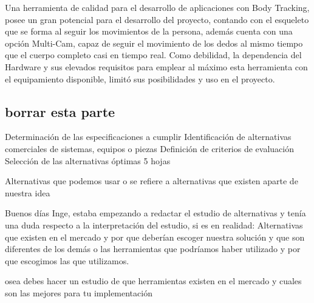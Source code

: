 Una herramienta de calidad para el desarrollo de aplicaciones con Body Tracking, posee un gran potencial para el desarrollo del proyecto, contando con el esqueleto que se forma al seguir los movimientos de la persona, además cuenta con una opción Multi-Cam, capaz de seguir el movimiento de los dedos al mismo tiempo que el cuerpo completo casi en tiempo real. Como debilidad, la dependencia del Hardware y sus elevados requisitos para emplear al máximo esta herramienta con el equipamiento disponible, limitó sus posibilidades y uso en el proyecto.

















\subsection{borrar esta parte}
Determinación de las especificaciones a cumplir
Identificación de alternativas comerciales de
sistemas, equipos o piezas
Definición de criterios de evaluación
Selección de las alternativas óptimas
5 hojas


Alternativas que podemos usar o se refiere a alternativas que existen aparte de nuestra idea

Buenos días Inge, estaba empezando a redactar el estudio de alternativas y tenía una duda respecto a la interpretación del estudio, si es en realidad:
Alternativas que existen en el mercado y por que deberían escoger nuestra solución y que son diferentes de los demás o las herramientas que podríamos haber utilizado y por que escogimos las que utilizamos.


osea debes hacer un estudio de que herramientas existen en el mercado y cuales son las mejores para tu implementación